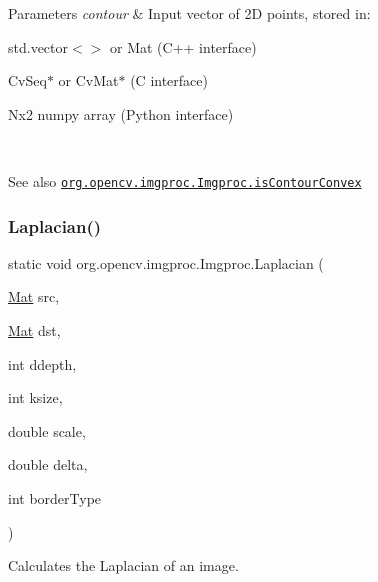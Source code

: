 \begin{DoxyParams}{Parameters}
{\em contour} & Input vector of 2D points, stored in\+: 
\begin{DoxyItemize}
\item {\ttfamily std.\+vector$<$$>$} or {\ttfamily Mat} (C++ interface) 
\item {\ttfamily Cv\+Seq$\ast$} or {\ttfamily Cv\+Mat$\ast$} (C interface) 
\item Nx2 numpy array (Python interface) 
\end{DoxyItemize}\\
\hline
\end{DoxyParams}
\begin{DoxySeeAlso}{See also}
\href{http://docs.opencv.org/modules/imgproc/doc/structural_analysis_and_shape_descriptors.html#iscontourconvex}{\tt org.\+opencv.\+imgproc.\+Imgproc.\+is\+Contour\+Convex} 
\end{DoxySeeAlso}
\mbox{\label{classorg_1_1opencv_1_1imgproc_1_1_imgproc_add62d4b55bc4e7cc4faca4a77f6d3f94}} 
\subsubsection{\texorpdfstring{Laplacian()}{Laplacian()}\hspace{0.1cm}{\footnotesize\ttfamily [1/3]}}
{\footnotesize\ttfamily static void org.\+opencv.\+imgproc.\+Imgproc.\+Laplacian (\begin{DoxyParamCaption}\item[{\mbox{\hyperlink{classorg_1_1opencv_1_1core_1_1_mat}{Mat}}}]{src,  }\item[{\mbox{\hyperlink{classorg_1_1opencv_1_1core_1_1_mat}{Mat}}}]{dst,  }\item[{int}]{ddepth,  }\item[{int}]{ksize,  }\item[{double}]{scale,  }\item[{double}]{delta,  }\item[{int}]{border\+Type }\end{DoxyParamCaption})\hspace{0.3cm}{\ttfamily [static]}}

Calculates the Laplacian of an image.

